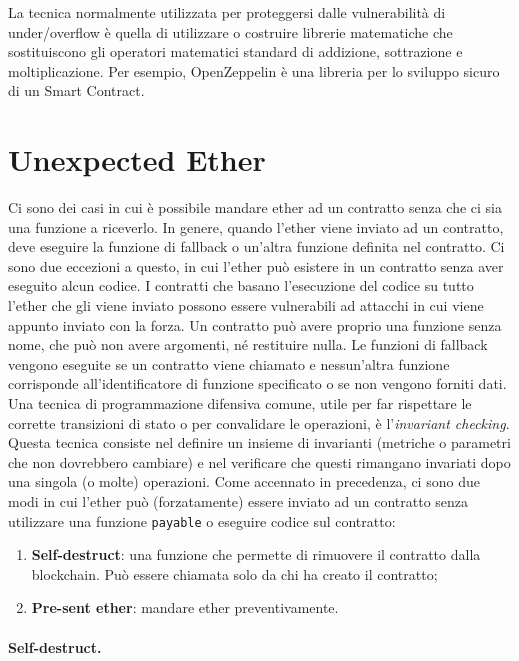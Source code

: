 La tecnica normalmente utilizzata per proteggersi dalle vulnerabilità di
under/overflow è
quella di utilizzare o costruire librerie matematiche che sostituiscono gli
operatori matematici
standard di addizione, sottrazione e moltiplicazione.
Per esempio, OpenZeppelin è una
libreria per lo sviluppo sicuro di un Smart Contract.

\vspace{-1.5em}

\section{Unexpected Ether}

Ci sono dei casi in cui è possibile mandare ether ad un contratto senza che ci
sia una funzione a riceverlo.
In genere, quando l'ether viene inviato ad un contratto, deve eseguire la
funzione di fallback o un'altra funzione definita nel contratto.
Ci sono due eccezioni a questo, in cui l'ether può
esistere in un contratto senza aver eseguito alcun codice.
I contratti che basano l'esecuzione
del codice su tutto l'ether che gli viene inviato possono essere vulnerabili ad
attacchi in cui
viene appunto inviato con la forza.
Un contratto può avere proprio una funzione senza nome,
che può non avere argomenti, né
restituire nulla. Le funzioni di fallback vengono eseguite se un contratto viene
chiamato e
nessun'altra funzione corrisponde all'identificatore di funzione specificato
o se non vengono forniti dati.
Una tecnica di programmazione difensiva comune, utile per far rispettare le
corrette transizioni di stato o per convalidare le operazioni, è
l'\textit{invariant checking}. Questa tecnica
consiste nel definire un insieme di invarianti
(metriche o parametri che non dovrebbero
cambiare) e nel verificare che questi rimangano invariati dopo una singola (o molte)
operazioni.
Come accennato in precedenza, ci sono due modi in cui l'ether può (forzatamente)
essere
inviato ad un contratto senza utilizzare una funzione \verb|payable| o eseguire
codice sul contratto:

\begin{enumerate}
      \item \textbf{Self-destruct}: una funzione che permette di rimuovere il
            contratto dalla blockchain.
            Può essere chiamata solo da chi ha creato il contratto;
      \item \textbf{Pre-sent ether}: mandare ether preventivamente.
\end{enumerate}

\paragraph{Self-destruct.}


